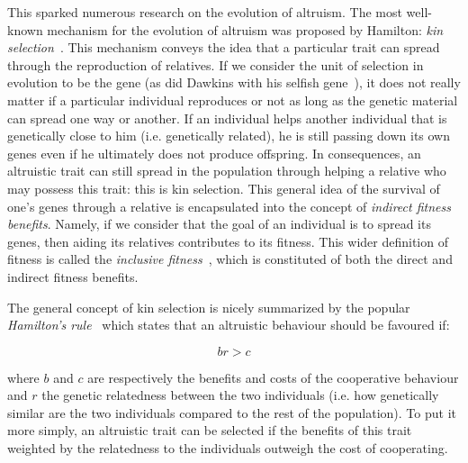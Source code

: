     This sparked numerous research on the evolution of altruism. The most well-known mechanism for the evolution of altruism was proposed by Hamilton: \emph{kin selection}~\parencite{Hamilton1964}. This mechanism conveys the idea that a particular trait can spread through the reproduction of relatives. If we consider the unit of selection in evolution to be the gene (as did Dawkins with his selfish gene~\parencite{Dawkins1976}), it does not really matter if a particular individual reproduces or not as long as the genetic material can spread one way or another. If an individual helps another individual that is genetically close to him (i.e. genetically related), he is still passing down its own genes even if he ultimately does not produce offspring. In consequences, an altruistic trait can still spread in the population through helping a relative who may possess this trait: this is kin selection. This general idea of the survival of one's genes through a relative is encapsulated into the concept of \emph{indirect fitness benefits}. Namely, if we consider that the goal of an individual is to spread its genes, then aiding its relatives contributes to its fitness. This wider definition of fitness is called the \emph{inclusive fitness}~\parencite{Grafen1984}, which is constituted of both the direct and indirect fitness benefits.

    The general concept of kin selection is nicely summarized by the popular \emph{Hamilton's rule}~\parencite{Hamilton1964} which states that an altruistic behaviour should be favoured if:

    \[br > c\]

    where $b$ and $c$ are respectively the benefits and costs of the cooperative behaviour and $r$ the genetic relatedness between the two individuals (i.e. how genetically similar are the two individuals compared to the rest of the population). To put it more simply, an altruistic trait can be selected if the benefits of this trait weighted by the relatedness to the individuals outweigh the cost of cooperating.

